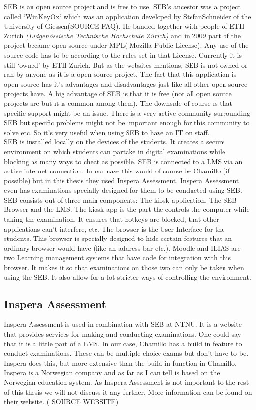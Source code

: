SEB is an open source project and is free to use. SEB's ancestor was a project called `WinKeyOx` which was an application developed by StefanSchneider of the University of Giessen(SOURCE FAQ). He banded together with people of ETH Zurich \textit{(Eidgenössische Technische Hochschule Zürich)} and in 2009 part of the project became open source under MPL( Mozilla Public License). Any use of the source code has to be according to the rules set in that License. Currently it is still `owned' by ETH Zurich. But as the websites mentions, SEB is not owned or ran by anyone as it is a open source project.
The fact that this application is open source has it's advantages and disadvantages just like all other open source projects have. A big advantage of SEB is that it is free (not all open source projects are but it is common among them). The downside of course is that specific support might be an issue. There is a very active community surrounding SEB but specific problems might not be important enough for this community to solve etc. So it's very useful when using SEB to have an IT on staff.\\

SEB is installed locally on the devices of the students. It creates a secure environment on which students can partake in digital examinations while blocking as many ways to cheat as possible. SEB is connected to a LMS via an active internet connection. In our case this would of course be Chamillo (if possible) but in this thesis they used Inspera Assessment. Inspera Assessment even has examinations specially designed for them to be conducted using SEB.
SEB consists out of three main components: The kiosk application, The SEB Browser and the LMS. The kiosk app is the part the controls the computer while taking the examination. It ensures that hotkeys are blocked, that other applications can't interfere, etc. 
The browser is the User Interface for the students. This browser is specially designed to hide certain features that an ordinary browser would have (like an address bar etc.). Moodle and ILIAS are two Learning management systems that have code for integration with this browser. It makes it so that examinations on those two can only be taken when using the SEB. It also allow for a lot stricter ways of controlling the environment. \\

\subsection{Inspera Assessment}
Inspera Assessment is used in combination with SEB at NTNU. It is a website that provides services for making and conducting examinations. One could say that it is a little part of a LMS. In our case, Chamillo has a build in feature to conduct examinations. These can be multiple choice exams but don't have to be.  Inspera does this, but more extensive than the build in function in Chamillo. Inspera is a Norwegian company and as far as I can tell is based on the Norwegian education system. As Inspera Assessment is not important to the rest of this thesis we will not discuss it any further. More information can be found on their website. ( SOURCE WEBSITE) 

